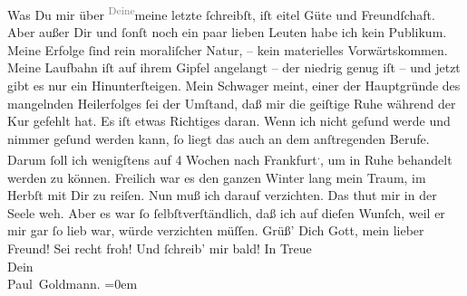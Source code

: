 \begin{ledgroupsized}[t]{13cm}
           Was Du mir über \substVorne{}\textsuperscript{\textcolor{gray}{Deine}}\substDazwischen{}meine\substHinten{} letzte \label{K_L02617-4v}\label{K_L02617-4h} ſchreibſt,
               iſt eitel Güte und Freundſchaft. Aber außer Dir und ſonſt noch ein paar lieben Leuten
               habe ich kein Publikum. Meine Erfolge ſind rein moraliſcher Natur, – kein materielles
               Vorwärtskommen. Meine Laufbahn iſt auf ihrem Gipfel angelangt – der niedrig genug iſt
               – und jetzt gibt es nur ein Hinunterſteigen.\pend
           \pstart
           {\pb}Mein Schwager meint, einer der Hauptgründe des mangelnden
               Heilerfolges ſei der Umſtand, daß mir die geiſtige Ruhe während der Kur gefehlt hat.
               Es iſt etwas Richtiges daran. Wenn ich nicht geſund werde und nimmer geſund werden
               kann, ſo liegt das auch an dem anſtregenden Berufe. Darum ſoll ich wenigſtens auf 4
               Wochen nach Frankfurt\substVorne{}\textsuperscript{.}\substDazwischen{},\substHinten{} um in Ruhe behandelt werden zu können. Freilich war es den ganzen Winter
               lang mein Traum, im Herbſt mit Dir zu reiſen. Nun muß ich darauf verzichten. Das thut
               mir in der Seele {\pb}weh. Aber es war ſo
               ſelbſtverſtändlich, daß ich auf dieſen Wunſch, weil er mir gar ſo lieb war, würde
               verzichten müſſen.\pend
           \pstart
           Grüß’ Dich Gott, mein lieber Freund! Sei recht froh! Und ſchreib’ mir bald!\pend
           \pstart
           In Treue {\\[\baselineskip]}Dein {\\[\baselineskip]}\spacefill\mbox{Paul Goldmann.}\pend
           \leftskip=0em{}
         
         \endnumbering{}\end{ledgroupsized}  \newcommand{\dateiname}{L02617}\newcommand{\titel}{Paul Goldmann an Arthur Schnitzler, 21. 4. [1894]}\newcommand{\editorInnen}{Martin Anton Müller und Laura Untner}
      